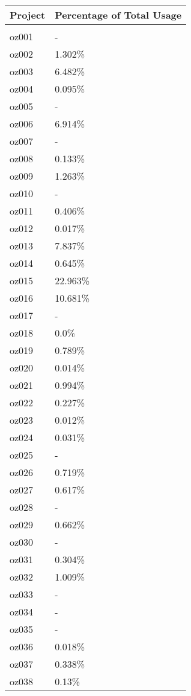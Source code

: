 \documentclass{article}%
\begin{document}
%
\begin{longtabu}{X[l] X[r]}%
\textbf{Project}&\textbf{Percentage of Total Usage}\\%
\hline%
&\\%
oz001&{-}\\%
\hline%
oz002&1.302\%\\%
\hline%
oz003&6.482\%\\%
\hline%
oz004&0.095\%\\%
\hline%
oz005&{-}\\%
\hline%
oz006&6.914\%\\%
\hline%
oz007&{-}\\%
\hline%
oz008&0.133\%\\%
\hline%
oz009&1.263\%\\%
\hline%
oz010&{-}\\%
\hline%
oz011&0.406\%\\%
\hline%
oz012&0.017\%\\%
\hline%
oz013&7.837\%\\%
\hline%
oz014&0.645\%\\%
\hline%
oz015&22.963\%\\%
\hline%
oz016&10.681\%\\%
\hline%
oz017&{-}\\%
\hline%
oz018&0.0\%\\%
\hline%
oz019&0.789\%\\%
\hline%
oz020&0.014\%\\%
\hline%
oz021&0.994\%\\%
\hline%
oz022&0.227\%\\%
\hline%
oz023&0.012\%\\%
\hline%
oz024&0.031\%\\%
\hline%
oz025&{-}\\%
\hline%
oz026&0.719\%\\%
\hline%
oz027&0.617\%\\%
\hline%
oz028&{-}\\%
\hline%
oz029&0.662\%\\%
\hline%
oz030&{-}\\%
\hline%
oz031&0.304\%\\%
\hline%
oz032&1.009\%\\%
\hline%
oz033&{-}\\%
\hline%
oz034&{-}\\%
\hline%
oz035&{-}\\%
\hline%
oz036&0.018\%\\%
\hline%
oz037&0.338\%\\%
\hline%
oz038&0.13\%\\%

\end{longtabu}
\end{document}
